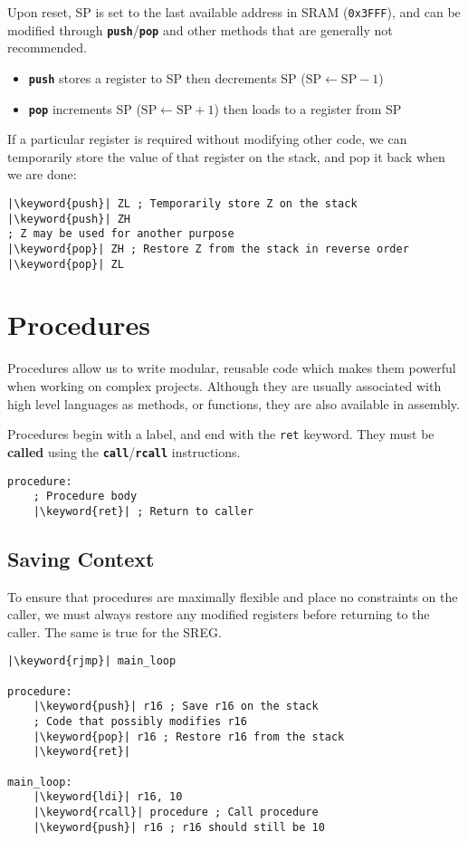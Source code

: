 \documentclass{report}
\newcommand{\keyword}[1]{\textcolor[rgb]{0.00,0.50,0.00}{\textbf{#1}}}
\newcommand{\keywordinline}[1]{\textcolor[rgb]{0.00,0.50,0.00}{\textbf{\texttt{#1}}}}
\begin{document}
Upon reset, SP is set to the last available address in SRAM
(\texttt{0x3FFF}), and can be modified through
\keywordinline{push}/\keywordinline{pop} and other methods that are
generally not recommended.%
\begin{itemize}
    \item \keywordinline{push} stores a register to SP then decrements SP (\(\mathrm{SP} \leftarrow \mathrm{SP} - 1\))
    \item \keywordinline{pop} increments SP (\(\mathrm{SP} \leftarrow \mathrm{SP} + 1\)) then loads to a register from SP
\end{itemize}
If a particular register is required without modifying other code, we can temporarily
store the value of that register on the stack, and pop it back when we are done:
\begin{verbatim}
|\keyword{push}| ZL ; Temporarily store Z on the stack
|\keyword{push}| ZH
; Z may be used for another purpose
|\keyword{pop}| ZH ; Restore Z from the stack in reverse order
|\keyword{pop}| ZL
\end{verbatim}
\section{Procedures}
Procedures allow us to write modular, reusable code which makes them
powerful when working on complex projects. Although they are usually
associated with high level languages as methods, or functions, they are
also available in assembly.

Procedures begin with a label, and end with the \texttt{ret}
keyword. They must be \textbf{called} using the
\keywordinline{call}/\keywordinline{rcall} instructions.
\begin{verbatim}
procedure:
    ; Procedure body
    |\keyword{ret}| ; Return to caller
\end{verbatim}
\subsection{Saving Context}
To ensure that procedures are maximally flexible and place no
constraints on the caller, we must always restore any modified
registers before returning to the caller. The same is true for the
SREG\@.
\begin{verbatim}
|\keyword{rjmp}| main_loop

procedure:
    |\keyword{push}| r16 ; Save r16 on the stack
    ; Code that possibly modifies r16
    |\keyword{pop}| r16 ; Restore r16 from the stack
    |\keyword{ret}|

main_loop:
    |\keyword{ldi}| r16, 10
    |\keyword{rcall}| procedure ; Call procedure
    |\keyword{push}| r16 ; r16 should still be 10
\end{verbatim}
\end{document}
